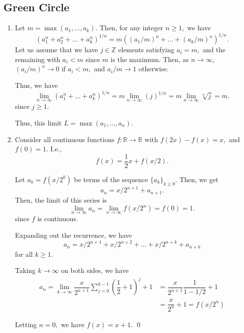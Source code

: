 \documentclass[12pt]{article}
\begin{document}
\subsection{Green Circle}
\begin{enumerate}
  \item[1] Let $m = \max(a_1, \ldots, a_k).$ Then, for any integer $n
    \geq 1,$ we have
    $$
    (a_1^n + a_2^n + \ldots +a_k^n)^{1/n} = m((a_1/m)^n + \ldots +
    (a_k/m)^n)^{1/n}.
    $$
    Let us assume that we have $j \in \mathbb Z$ elements satisfying
    $a_i = m,$ and the remaining with $a_i < m$ since $m$ is the
    maximum. Then, as $n \to \infty,$ $(a_i / m)^n \to 0$ if $a_i <
    m,$ and $a_i /m \to 1$ otherwise.

    Thus, we have
    $$
    \lim_{n \to \infty}(a_1^n + \ldots + a_k^n)^{1/n} = m \lim_{n \to
    \infty} (j)^{1/n} =  m \lim_{n \to \infty} \sqrt[n]j{} = m.
    $$
    since $j \geq 1.$

    Thus, this limit $L = \max(a_1, \ldots, a_n).$

  \item[2] Consider all continuous functions $f: \mathbb R \to
    \mathbb R$ with $f(2x) - f(x) = x, $ and $f(0) = 1.$ I.e.,
    $$
    f(x) = \dfrac{1}{2}x + f(x/2).
    $$

    Let $a_k = f(x/2^k)$ be terms of the sequence $\{a_k\}_{k \geq
    0}.$ Then, we get
    $$
    a_n = x/2^{n + 1} + a_{n + 1}.
    $$
    Then, the limit of this series is
    $$
    \lim_{n \to \infty}a_n =  \lim_{n \to \infty} f(x/2^n) = f(0) = 1.
    $$
    since $f$ is continuous.

    Expanding out the recurrence, we have
    $$
    a_n = x/2^{n + 1} + x/2^{n + 2} + \ldots + x/2^{n + k} + a_{n + k}
    $$
    for all $k \geq 1.$

    Taking $k \to \infty$ on both sides, we have
    \begin{align*}
      a_n = \lim_{k \to \infty}\dfrac{x}{2^{n + 1}}\sum_{j = 0}^{k - 1} \left(
        \dfrac{1}{2} + 1
      \right)^{j} + 1 &= \dfrac{x}{2^{n + 1}} \dfrac{1}{1 - 1/2} + 1 \\
      &= \dfrac{x}{2^{n}}  +1 = f(x/2^{n})
    \end{align*}

    Letting $n = 0,$ we have $f(x) = x+ 1.$ \qed


\end{enumerate}
\end{document}
